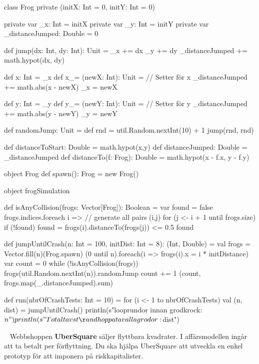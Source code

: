\SubtaskSolved
\begin{Code}

class Frog private (initX: Int = 0, initY: Int = 0) {
	private var _x: Int = initX
	private var _y: Int = initY
	private var _distanceJumped: Double = 0

	def jump(dx: Int, dy: Int): Unit = {
		_x += dx
		_y += dy
		_distanceJumped += math.hypot(dx, dy)
	}

	def x: Int = _x
  def x_= (newX: Int): Unit = { // Setter för x
		_distanceJumped += math.abs(x - newX)
		_x = newX
	}

  def y: Int = _y
	def y_= (newY: Int): Unit = { // Setter för y
		_distanceJumped += math.abs(y - newY)
		_y = newY
	}


	def randomJump: Unit = {
		def rnd = util.Random.nextInt(10) + 1
		jump(rnd, rnd)
	}

	def distanceToStart: Double = math.hypot(x,y)
	def distanceJumped: Double = _distanceJumped
	def distanceTo(f: Frog): Double = math.hypot(x - f.x, y - f.y)
}

object Frog {
	def spawn(): Frog = new Frog()
}

\end{Code}

\SubtaskSolved
\begin{Code}
object frogSimulation {
  def isAnyCollision(frogs: Vector[Frog]): Boolean = {
    var found = false
    frogs.indices.foreach { i =>  // generate all pairs (i,j)
      for (j <- i + 1 until frogs.size)
        if (!found) found = frogs(i).distanceTo(frogs(j)) <= 0.5
    }
    found
  }

  def jumpUntilCrash(n: Int = 100, initDist: Int = 8): (Int, Double) = {
    val frogs = Vector.fill(n)(Frog.spawn)
    (0 until n).foreach(i => frogs(i).x = i * initDistance)
    var count = 0
    while (!isAnyCollision(frogs)) {
      frogs(util.Random.nextInt(n)).randomJump
    	count += 1
    }
    (count, frogs.map(_.distanceJumped).sum)
  }

  def run(nbrOfCrashTests: Int = 10) = for (i <- 1 to nbrOfCrashTests) {
    val (n, dist) = jumpUntilCrash()
    println(s"\nAntalet looprundor innan grodkrock: $n")
    println(s"Totalt avstånd hoppat av alla grodor: $dist")
  }
}
\end{Code}

\QUESTEND




\QUESTBEGIN

\Task  \what~  Webbshoppen \textbf{UberSquare} säljer flyttbara kvadrater. I affärsmodellen ingår att ta betalt per förflyttning. Du ska hjälpa UberSquare att utveckla en enkel prototyp för att imponera på riskkapitalister.

